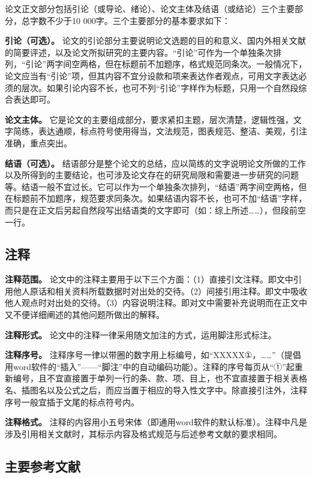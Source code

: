 \documentclass[singlesided]{Style/ucasthesis}%
\begin{document}
论文正文部分包括引论（或导论、绪论）、论文主体及结语（或结论）三个主要部分，总字数不少于10 000字。三个主要部分的基本要求如下：

\textbf{引论（可选）。} 论文的引论部分主要说明论文选题的目的和意义、国内外相关文献的简要评述，以及论文所拟研究的主要内容。``引论''可作为一个单独条次排列，``引论''两字间空两格，但在标题前不加题序，格式规范同条次。一般情况下，论文应当有``引论''项，但其内容不宜分设款和项来表达作者观点，可用文字表达必须的层次。如果引论内容不长，也可不列``引论''字样作为标题，只用一个自然段综合表达即可。

\textbf{论文主体。} 它是论文的主要组成部分，要求紧扣主题，层次清楚，逻辑性强，文字简练，表达通顺，标点符号使用得当，文法规范，图表规范、整洁、美观，引注准确，重点突出。

\textbf{结语（可选）。} 结语部分是整个论文的总结，应以简练的文字说明论文所做的工作以及所得到的主要结论，也可涉及论文存在的研究局限和需要进一步研究的问题等。结语一般不宜过长。它可以作为一个单独条次排列，``结语''两字间空两格，但在标题前不加题序，规范要求同条次。如果结语内容不长，也可不加``结语''字样，而只是在正文后另起自然段写出结语类的文字即可（如：综上所述\ldots{}\ldots{}），但段前空一行。

\hypertarget{section-19}{%
\subsection{注释}\label{section-19}}

\textbf{注释范围。} 论文中的注释主要用于以下三个方面：（1）直接引文注释。即文中引用他人原话和相关资料所载数据时对出处的交待。（2）间接引用注释。即文中吸收他人观点时对出处的交待。（3）内容说明注释。即对文中需要补充说明而在正文中又不便详细阐述的其他问题所做出的解释。

\textbf{注释形式。} 论文中的注释一律采用随文加注的方式，运用脚注形式标注。

\textbf{注释序号。} 注释序号一律以带圈的数字用上标编号，如``XXXXX①，\ldots{}\ldots{}''（提倡用word软件的``插入''------``脚注''中的自动编码功能）。注释的序号每页从``①''起重新编号，且不宜直接置于单列一行的条、款、项、目上，也不宜直接置于相关表格名、插图名以及公式之后，而应当置于相应的导入性文字中。除直接引注外，注释序号一般宜插于文尾的标点符号内。

\textbf{注释格式。} 注释的内容用小五号宋体（即通用word软件的默认标准）。注释中凡是涉及引用相关文献时，其标示内容及格式规范与后述参考文献的要求相同。

\hypertarget{section-20}{%
\subsection{主要参考文献}\label{section-20}}
\end{document}
